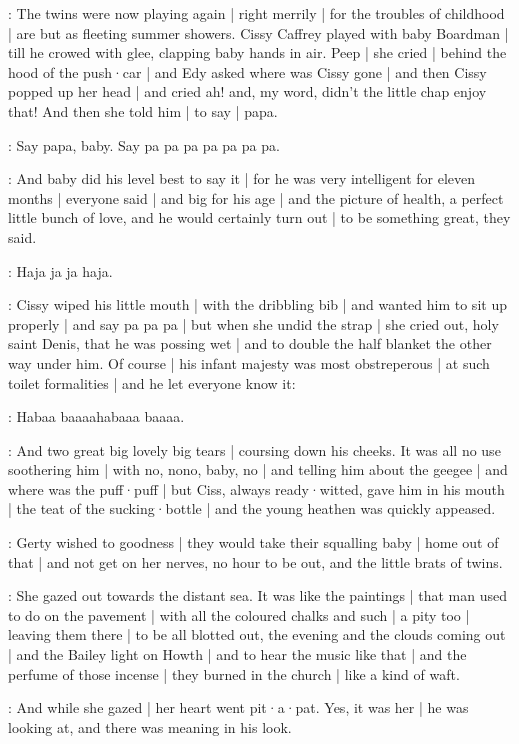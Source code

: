 :
The twins were now playing again |
right merrily |
for the troubles of childhood |
are but as fleeting summer showers.
Cissy Caffrey played with baby Boardman |
till he crowed with glee,
clapping baby hands in air.
Peep |
she cried |
behind the hood of the push·car |
and Edy asked where was Cissy gone |
and then Cissy popped up her head |
and cried ah!
and,
my word,
didn't the little chap enjoy that!
And then she told him |
to say |
papa.

\cissy:
Say papa,
baby.
Say pa pa pa pa pa pa pa.

:
And baby did his level best to say it |
for he was very intelligent for eleven months |
everyone said |
and big for his age |
and the picture of health,
a perfect little bunch of love,%
and he would certainly turn out |
to be something great,
they said.

\baby:
Haja ja ja haja.

:
Cissy wiped his little mouth |
with the dribbling bib |
and wanted him to sit up properly |
and say pa pa pa |
but when she undid the strap |
she cried out,
holy saint Denis,
that he was possing wet |
and to double the half blanket the other way under him.
Of course |
his infant majesty was most obstreperous |
at such toilet formalities |
and he let everyone know it:

\baby:
Habaa baaaahabaaa baaaa.

:
And two great big lovely big tears |
coursing down his cheeks.
It was all no use
soothering him |
with no, nono, baby, no |%
and telling him about the geegee |
and where was the puff·puff |
but Ciss,
always ready·witted,
gave him in his mouth |
the teat of the sucking·bottle |
and the young heathen was quickly appeased.

\gertyJudgy:
Gerty wished to goodness |
they would take their squalling baby |
home out of that |
and not get on her nerves,
no hour to be out,
and the little brats of twins.

\gertyReal:
She gazed out towards the distant sea.
It was like the paintings |
that man used to do on the pavement |
with all the coloured chalks and such |
a pity too |
leaving them there |
to be all blotted out,
the evening and the clouds coming out |
and the Bailey light on Howth |
and to hear the music like that |
and the perfume of those incense |
they burned in the church |%
like a kind of waft.

\gertySex:
And while she gazed |
her heart went pit·a·pat.
Yes,
it was her |
he was looking at,
and there was meaning in his look.

